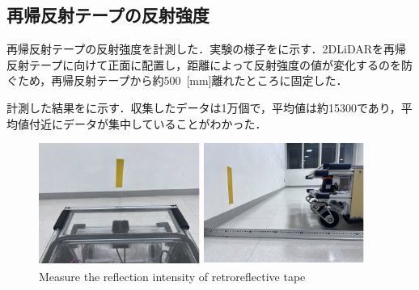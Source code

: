 \newpage

\subsection{再帰反射テープの反射強度}

  再帰反射テープの反射強度を計測した．実験の様子をに示す．2DLiDARを再帰反射テープに向けて正面に配置し，距離によって反射強度の値が変化するのを防ぐため，再帰反射テープから約500 \,[mm]離れたところに固定した．
    
  計測した結果をに示す．収集したデータは1万個で，平均値は約15300であり，平均値付近にデータが集中していることがわかった．

  \begin{figure}[h]
    \centering
    \begin{minipage}[c]{65mm} 
        \centering
        \includegraphics[height=40mm]{images/pdf/RobotGuidance_exp2_tape_from_back}
    \end{minipage}
    \begin{minipage}[c]{65mm} 
        \centering
        \includegraphics[height=40mm]{images/pdf/RobotGuidance_exp2_tape_from_side}
    \end{minipage}
    \caption{Measure the reflection intensity of retroreflective tape}
    \label{Fig:RobotGuidance_exp2_tape}
  \end{figure}


